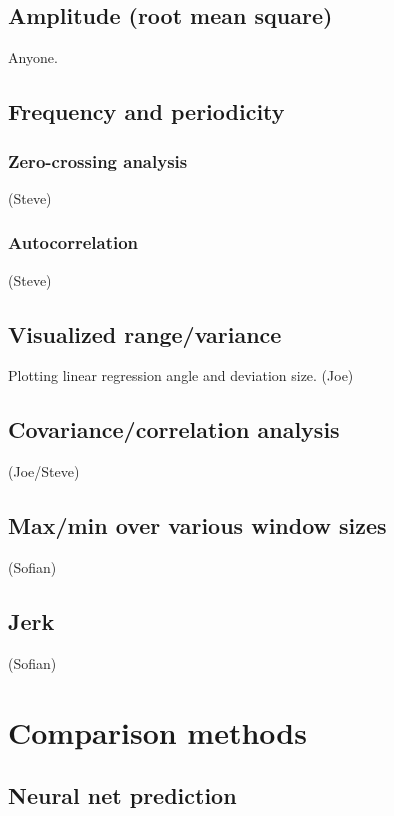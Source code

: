 \documentclass{article}
\begin{document}
\subsection{Amplitude (root mean square)}

Anyone.

\subsection{Frequency and periodicity}

\subsubsection{Zero-crossing analysis}

(Steve)

\subsubsection{Autocorrelation}

(Steve)

\subsection{Visualized range/variance}

Plotting linear regression angle and deviation size. (Joe)

\subsection{Covariance/correlation analysis}

(Joe/Steve)

\subsection{Max/min over various window sizes}

(Sofian)

\subsection{Jerk}

(Sofian)

\section{Comparison methods}

\subsection{Neural net prediction}
\end{document}
